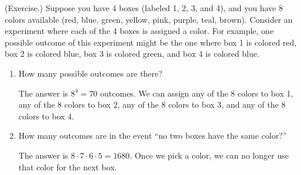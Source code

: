 \documentclass[letterpaper]{article}
\begin{document}
\begin{mdframed}
    (Exercise.) Suppose you have 4 boxes (labeled 1, 2, 3, and 4), and you have 8 colors available (red, blue, green, yellow, pink, purple, teal, brown). Consider an experiment where each of the 4 boxes is assigned a color. For example, one possible outcome of this experiment might be the one where box 1 is colored red, box 2 is colored blue, box 3 is colored green, and box 4 is colored blue.

    \begin{enumerate}
        \item How many possible outcomes are there?
        \begin{mdframed}
            The answer is $8^4 = 70$ outcomes. We can assign any of the 8 colors to box 1, any of the 8 colors to box 2, any of the 8 colors to box 3, and any of the 8 colors to box 4.   
        \end{mdframed}
        \item How many outcomes are in the event ``no two boxes have the same color?''
        \begin{mdframed}
            The answer is $8 \cdot 7 \cdot 6 \cdot 5 = 1680$. Once we pick a color, we can no longer use that color for the next box. 
        \end{mdframed}
    \end{enumerate}
\end{mdframed}
\end{document}
